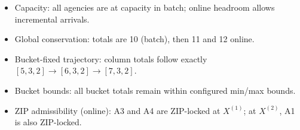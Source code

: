 \documentclass[11pt]{article}
\begin{document}
\begin{itemize}
\item Capacity: all agencies are at capacity in batch; online headroom allows incremental arrivals.
\item Global conservation: totals are 10 (batch), then 11 and 12 online.
\item Bucket-fixed trajectory: column totals follow exactly
$[5,3,2]\to[6,3,2]\to[7,3,2]$.
\item Bucket bounds: all bucket totals remain within configured min/max bounds.
\item ZIP admissibility (online): A3 and A4 are ZIP-locked at $X^{(1)}$; at $X^{(2)}$, A1 is also ZIP-locked.
\end{itemize}
\end{document}
